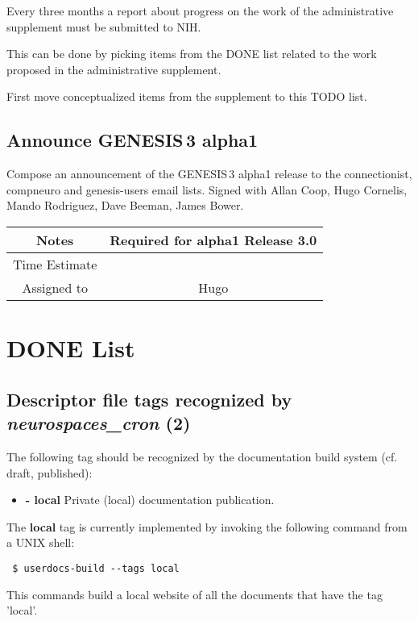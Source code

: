 \documentclass[12pt]{article}
\begin{document}
Every three months a report about progress on the work of the
administrative supplement must be submitted to NIH.

This can be done by picking items from the DONE list related to the
work proposed in the administrative supplement.

First move conceptualized items from the supplement to this TODO list.


\subsection{Announce GENESIS\,3 alpha1}

Compose an announcement of the GENESIS\,3 alpha1 release to the
connectionist, compneuro and genesis-users email lists.  Signed with
Allan Coop, Hugo Cornelis, Mando Rodriguez, Dave Beeman, James Bower.

{
  \vspace{5mm}
  \centering
  \begin{tabular}{|c|c|}
    \hline
    Notes
    & Required for alpha1 Release 3.0 \\
    \hline
    Time Estimate
    & \\
    \hline
    Assigned to
    & Hugo \\
    \hline
  \end{tabular}
}


\section{DONE List}

\subsection{Descriptor file tags recognized by {\it neurospaces\_cron} (2)}

The following tag should be recognized by the documentation build
system (cf. draft, published):
\begin{itemize}
    \item[]{\bf - local} Private (local) documentation publication.
\end{itemize}

The {\bf local} tag is currently implemented by invoking the following
command from a UNIX shell:

\begin{verbatim}
 $ userdocs-build --tags local
\end{verbatim}

This commands build a local website of all the documents that have the
tag 'local'.
\end{document}
